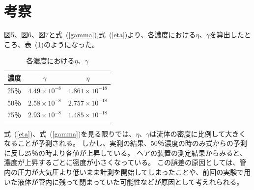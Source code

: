 \documentclass[a4j,10pt]{jarticle}
\newcommand{\Tabref}[1]{表~(\ref{#1})}
\newcommand{\Equref}[1]{式~(\ref{#1})}
\begin{document}
\section{考察}
図5、図6、図7と\Equref{gamma},\Equref{eta}より、各濃度における$\eta$、$\gamma$を算出したところ、\Tabref{kousatu}のようになった。
\begin{table}[h]
\begin{center}
\caption{各濃度における$\eta$、$\gamma$}
\label{kousatu}
\begin{tabular}{|c|c|c|}\hline
濃度& $\gamma$ & $\eta$ \\ \hline \hline
  25％& $4.49 \times 10^{-8}$ & $1.861 \times 10^{-18}$ \\ \hline
  50％& $2.58 \times 10^{-8}$ & $2.757 \times 10^{-18}$ \\ \hline
  75％& $2.93 \times 10^{-8}$ & $1.485 \times 10^{-18}$ \\ \hline
\end{tabular}
\end{center}
\end{table}
\Equref{eta}、\Equref{gamma}を見る限りでは、$\eta$、$\gamma$は流体の密度に比例して大きくなることが予測される。
しかし、実測の結果、50％濃度の時のみ式からの予測に反し25％の時より各値が上昇している。
ヘアの装置の測定結果からみると、濃度が上昇するごとに密度が小さくなっている。
この誤差の原因としては、管内の圧力が大気圧より低いまま計測を開始してしまったことや、前回の実験で用いた液体が管内に残って閉まっていた可能性などが原因として考えれられる。
\end{document}

